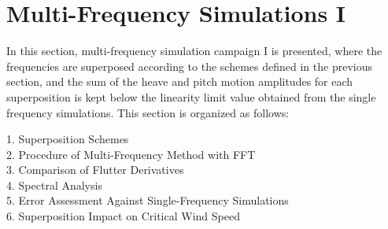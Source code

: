 \documentclass[../main]{subfiles}
\begin{document}


\section{Multi-Frequency Simulations I}

In this section, multi-frequency simulation campaign I is presented, where the frequencies are superposed according to the schemes defined in the previous section, and 
the sum of the heave and pitch motion amplitudes for each 
superposition is kept below the linearity limit value obtained from the single frequency simulations.
This section is organized as follows:

\begin{flushleft}
\hspace{2cm}1. Superposition Schemes \\
\hspace{2cm}2. Procedure of Multi-Frequency Method with FFT \\
\hspace{2cm}3. Comparison of Flutter Derivatives \\
\hspace{2cm}4. Spectral Analysis \\
\hspace{2cm}5. Error Assessment Against Single-Frequency Simulations \\
\hspace{2cm}6. Superposition Impact on Critical Wind Speed \\
\end{flushleft}
\end{document}

